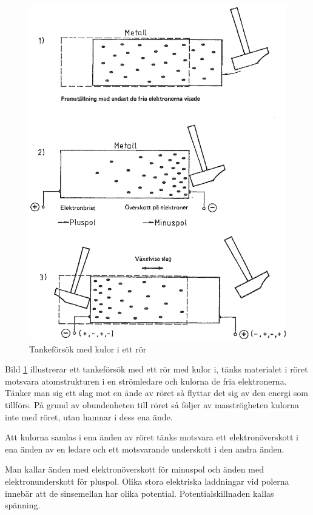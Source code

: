 \begin{figure}
\begin{center}
\includegraphics[width=\textwidth]{images/cropped_pdfs/bild_2_1-02.pdf}
\caption{Tankeförsök med kulor i ett rör}
\label{fig:BildII1-2}
\end{center}
\end{figure}

Bild \ref{fig:BildII1-2} illustrerar ett tankeförsök med ett rör med kulor i,
tänks materialet i röret motsvara atomstrukturen i en strömledare och kulorna
de fria elektronerna.
Tänker man sig ett slag mot en ände av röret så flyttar det sig av den energi
som tillförs.
På grund av obundenheten till röret så följer av masströgheten kulorna inte med
röret, utan hamnar i dess ena ände.

Att kulorna samlas i ena änden av röret tänks motsvara ett elektronöverskott i
ena änden av en ledare och ett motsvarande underskott i den andra änden.

Man kallar änden med elektronöverskott för minuspol och änden med
elektronunderskott för pluspol.
Olika stora elektriska laddningar vid polerna innebär att de sinsemellan har
olika potential.
Potentialskillnaden kallas spänning.

